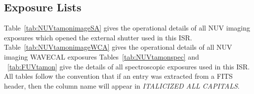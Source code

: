 \subsection{Exposure Lists}\label{subsec:elists}

Table~\ref{tab:NUVtamonimageSA} gives the operational details of all NUV imaging exposures which opened the
external shutter used in this ISR. Table~\ref{tab:NUVtamonimageWCA} gives the operational details of all NUV imaging WAVECAL
exposures
Tables~\ref{tab:NUVtamonspec} and ~\ref{tab:FUVtamon} give the details of all spectroscopic exposures used in this ISR.
All tables follow the convention that if an entry was extracted from a FITS header, then the column name will appear in \textit{ITALICIZED ALL CAPITALS}.\\


